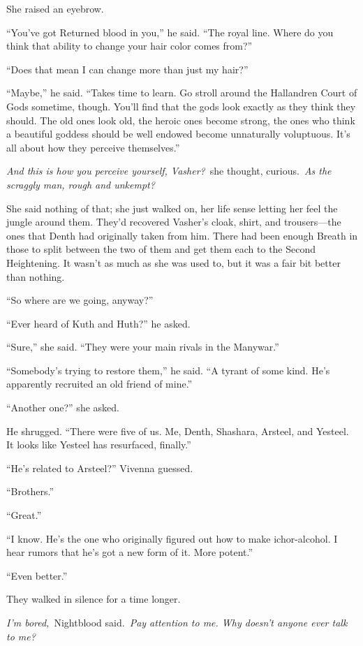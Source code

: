 She raised an eyebrow.

“You’ve got Returned blood in you,” he said. “The royal line. Where do you think that ability to change your hair color comes from?”

“Does that mean I can change more than just my hair?”

“Maybe,” he said. “Takes time to learn. Go stroll around the Hallandren Court of Gods sometime, though. You’ll find that the gods look exactly as they think they should. The old ones look old, the heroic ones become strong, the ones who think a beautiful goddess should be well endowed become unnaturally voluptuous. It’s all about how they perceive themselves.”

\textit{And this is how you perceive yourself, Vasher?}~she thought, curious.~\textit{As the scraggly man, rough and unkempt?}

She said nothing of that; she just walked on, her life sense letting her feel the jungle around them. They’d recovered Vasher’s cloak, shirt, and trousers—the ones that Denth had originally taken from him. There had been enough Breath in those to split between the two of them and get them each to the Second Heightening. It wasn’t as much as she was used to, but it was a fair bit better than nothing.

“So where are we going, anyway?”

“Ever heard of Kuth and Huth?” he asked.

“Sure,” she said. “They were your main rivals in the Manywar.”

“Somebody’s trying to restore them,” he said. “A tyrant of some kind. He’s apparently recruited an old friend of mine.”

“Another one?” she asked.

He shrugged. “There were five of us. Me, Denth, Shashara, Arsteel, and Yesteel. It looks like Yesteel has resurfaced, finally.”

“He’s related to Arsteel?” Vivenna guessed.

“Brothers.”

“Great.”

“I know. He’s the one who originally figured out how to make ichor-alcohol. I hear rumors that he’s got a new form of it. More potent.”

“Even better.”

They walked in silence for a time longer.

\textit{I’m bored,}~Nightblood said.~\textit{Pay attention to me. Why doesn’t anyone ever talk to me?}

